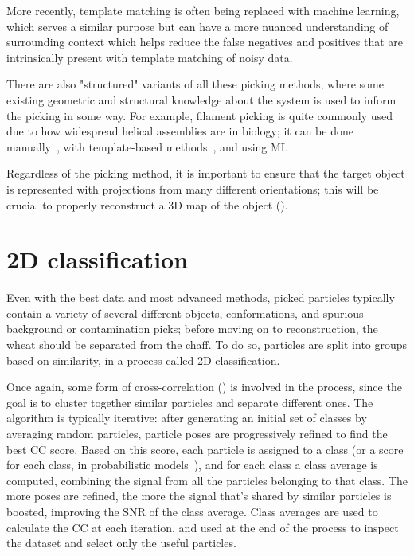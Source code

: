 More recently, template matching is often being replaced with machine learning, which serves a similar purpose but can have a more nuanced understanding of surrounding context which helps reduce the false negatives and positives that are intrinsically present with template matching of noisy data.

There are also "structured" variants of all these picking methods, where some existing geometric and structural knowledge about the system is used to inform the picking in some way.
For example, filament picking is quite commonly used due to how widespread helical assemblies are in biology; it can be done manually~\cite{scheresRELIONImplementationBayesian2012,heHelicalReconstructionRELION2017}, with template-based methods~\cite{punjaniCryoSPARCAlgorithmsRapid2017}, and using ML~\cite{wagnerSPHIREcrYOLOFastAccurate2019,wagnerEvolutionSPHIREcrYOLOParticle2020}.

Regardless of the picking method, it is important to ensure that the target object is represented with projections from many different orientations; this will be crucial to properly reconstruct a 3D map of the object ().

\section{2D classification}\label{em_classification}

Even with the best data and most advanced methods, picked particles typically contain a variety of several different objects, conformations, and spurious background or contamination picks; before moving on to reconstruction, the wheat should be separated from the chaff.
To do so, particles are split into groups based on similarity, in a process called 2D classification.

Once again, some form of cross-correlation () is involved in the process, since the goal is to cluster together similar particles and separate different ones.
The algorithm is typically iterative: after generating an initial set of classes by averaging random particles, particle poses are progressively refined to find the best CC score.
Based on this score, each particle is assigned to a class (or a score for each class, in probabilistic models~\cite{scheresRELIONImplementationBayesian2012}), and for each class a class average is computed, combining the signal from all the particles belonging to that class. The more poses are refined, the more the signal that's shared by similar particles is boosted, improving the SNR of the class average.
Class averages are used to calculate the CC at each iteration, and used at the end of the process to inspect the dataset and select only the useful particles.

